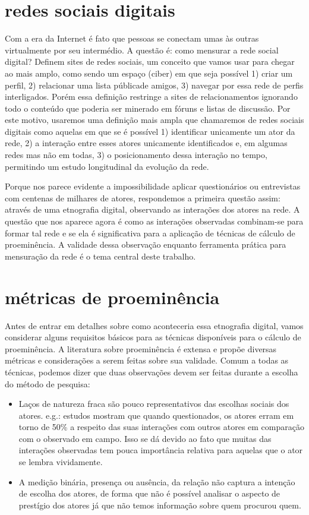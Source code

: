 \documentclass{article}
\begin{document}
\section{redes sociais digitais}

Com a era da Internet é fato que pessoas se conectam umas às outras virtualmente
por seu intermédio. A questão é: como mensurar a rede social digital? Definem
sites de redes sociais, um conceito que vamos usar para chegar ao mais amplo,
como sendo um espaço (ciber) em que seja possível 1) criar um perfil, 2)
relacionar uma lista públicade amigos, 3) navegar por essa rede de perfis
interligados. Porém essa definição restringe a sites de relacionamentos
ignorando todo o conteúdo que poderia ser minerado em fóruns e listas de
discussão. Por este motivo, usaremos uma definição mais ampla que chamaremos de
redes sociais digitais como aquelas em que se é possível 1) identificar
unicamente um ator da rede, 2) a interação entre esses atores unicamente
identificados e, em algumas redes mas não em todas, 3) o posicionamento dessa
interação no tempo, permitindo um estudo longitudinal da evolução da rede.

Porque nos parece evidente a impossibilidade aplicar questionários ou
entrevistas com centenas de milhares de atores, respondemos a primeira questão
assim: através de uma etnografia digital, observando as interações dos atores na
rede. A questão que nos aparece agora é como as interações observadas
combinam-se para formar tal rede e se ela é significativa para a aplicação de
técnicas de cálculo de proeminência. A validade dessa observação enquanto
ferramenta prática para mensuração da rede é o tema central deste trabalho.

\section{métricas de proeminência}

Antes de entrar em detalhes sobre como aconteceria essa etnografia digital,
vamos considerar alguns requisitos básicos para as técnicas disponíveis para o
cálculo de proeminência. A literatura sobre proeminência é extensa e propõe
diversas métricas e considerações a serem feitas sobre sua validade. Comum a
todas as técnicas, podemos dizer que duas observações devem ser feitas durante
a escolha do método de pesquisa:
\begin{itemize}
\item Laços de natureza fraca são pouco representativos das escolhas sociais dos
atores. e.g.: estudos mostram que quando questionados, os atores erram em torno
de 50\% a respeito das suas interações com outros atores em comparação com o
observado em campo. Isso se dá devido ao fato que muitas das interações
observadas tem pouca importância relativa para aquelas que o ator se lembra
vividamente.
\item A medição binária, presença ou ausência, da relação não captura a intenção
de escolha dos atores, de forma que não é possível analisar o aspecto de
prestígio dos atores já que não temos informação sobre quem procurou quem.
\end{itemize}
\end{document}
